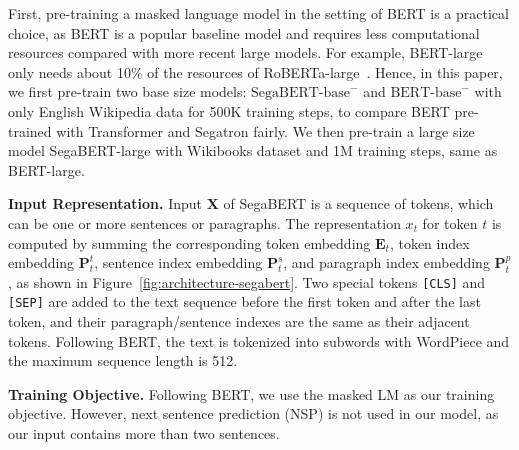 \documentclass[letterpaper]{article}
\begin{document}
First, pre-training a masked language model in the setting of BERT is a practical choice, as BERT is a popular baseline model and requires less computational resources compared with more recent large models. 
For example, BERT-large only needs about 10\% of the resources of RoBERTa-large~\cite{DBLP:journals/corr/abs-1907-11692}.
Hence, in this paper, we first pre-train two base size models: $\text{SegaBERT-base}^{-}$ and $\text{BERT-base}^{-}$ with only English Wikipedia data for 500K training steps, to compare BERT pre-trained with Transformer and Segatron fairly. 
We then pre-train a large size model SegaBERT-large with Wikibooks dataset and 1M training steps, same as BERT-large. 

\smallskip\noindent\textbf{Input Representation.} 
Input $\mathbf{X}$ of SegaBERT is a sequence of tokens, which can be one or more sentences or paragraphs.
The representation $x_t$ for token $t$ is computed by summing the corresponding token embedding $\mathbf{E}_t$, token index embedding $\mathbf{P}^t_t$, sentence index embedding $\mathbf{P}^s_t$, and paragraph index embedding $\mathbf{P}^p_t$, as shown in Figure~\ref{fig:architecture-segabert}.
Two special tokens \texttt{[CLS]} and \texttt{[SEP]} are added to the text sequence before the first token and after the last token, and their paragraph/sentence indexes are the same as their adjacent tokens.
Following BERT, the text is tokenized into subwords with WordPiece and the maximum sequence length is 512. 

\smallskip\noindent\textbf{Training Objective.}
Following BERT, we use the masked LM as our training objective.
However, next sentence prediction (NSP) is not used in our model, as our input contains more than two sentences.
\end{document}
